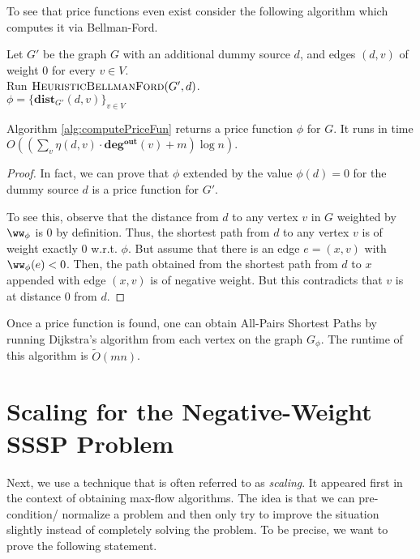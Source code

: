 To see that price functions even exist consider the following algorithm which computes it via Bellman-Ford.

\begin{algorithm}
Let $G'$ be the graph $G$ with an additional dummy source $d$, and edges $(d,v)$ of weight $0$ for every $v \in V$. \\
Run $\textsc{HeuristicBellmanFord}(G',d)$.\\
\Return $\phi =\{ \mathbf{dist}_{G'}(d,v)\}_{v \in V}$
\caption{$\textsc{ComputePriceFunction}(G)$}
\label{alg:computePriceFun}
\end{algorithm}

\begin{claim}
Algorithm \ref{alg:computePriceFun} returns a price function $\phi$ for $G$.  It runs in time $O((\sum_v \eta(d,v) \cdot \mathbf{deg^{out}}(v) + m) \log n)$. 
\end{claim}
\begin{proof}
In fact, we can prove that $\phi$ extended by the value $\phi(d) = 0$ for the dummy source $d$ is a price function for $G'$. 

To see this, observe that the distance from $d$ to any vertex $v$ in $G$ weighted by $\ww_{\phi}$ is $0$ by definition. Thus, the shortest path from $d$ to any vertex $v$ is of weight exactly $0$ w.r.t. $\phi$. But assume that there is an edge $e = (x, v)$ with $\ww_{\phi}(e) < 0$. Then, the path obtained from the shortest path from $d$ to $x$ appended with edge $(x,v)$ is of negative weight. But this contradicts that $v$ is at distance $0$ from $d$.
\end{proof}

Once a price function is found, one can obtain All-Pairs Shortest Paths by running Dijkstra's algorithm from each vertex on the graph $G_{\phi}$.  The runtime of this algorithm is $\tilde{O}(mn)$. 

\section{Scaling for the Negative-Weight SSSP Problem}

Next, we use a technique that is often referred to as \emph{scaling}. It appeared first in the context of obtaining max-flow algorithms. The idea is that we can pre-condition/ normalize a problem and then only try to improve the situation slightly instead of completely solving the problem. To be precise, we want to prove the following statement.

